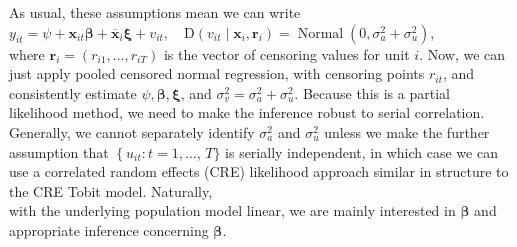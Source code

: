 \documentclass[10pt]{article}
\begin{document}
As usual, these assumptions mean we can write\\
$y_{i t}=\psi+\mathbf{x}_{i t} \boldsymbol{\beta}+\overline{\mathbf{x}}_{i} \boldsymbol{\xi}+v_{i t}, \quad \mathrm{D}\left(v_{i t} \mid \mathbf{x}_{i}, \mathbf{r}_{i}\right)=\operatorname{Normal}\left(0, \sigma_{a}^{2}+\sigma_{u}^{2}\right)$,\\
where $\mathbf{r}_{i}=\left(r_{i 1}, \ldots, r_{i T}\right)$ is the vector of censoring values for unit $i$. Now, we can just apply pooled censored normal regression, with censoring points $r_{i t}$, and consistently estimate $\psi, \boldsymbol{\beta}, \boldsymbol{\xi}$, and $\sigma_{v}^{2}=\sigma_{a}^{2}+\sigma_{u}^{2}$. Because this is a partial likelihood method, we need to make the inference robust to serial correlation. Generally, we cannot separately identify $\sigma_{a}^{2}$ and $\sigma_{u}^{2}$ unless we make the further assumption that $\left\{u_{i t}: t=1, \ldots\right.$, $T\}$ is serially independent, in which case we can use a correlated random effects (CRE) likelihood approach similar in structure to the CRE Tobit model. Naturally,\\
with the underlying population model linear, we are mainly interested in $\boldsymbol{\beta}$ and appropriate inference concerning $\boldsymbol{\beta}$.
\end{document}

